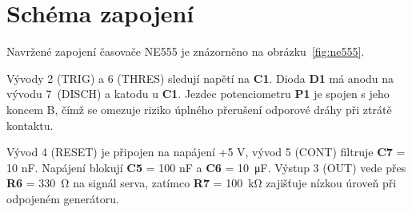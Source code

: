 \section{Schéma zapojení}

Navržené zapojení časovače NE555 je znázorněno na obrázku~\ref{fig:ne555}.

\noindent\begin{minipage}{\textwidth}\centering

\captionsetup{hypcap=false}
\label{fig:ne555}
\end{minipage}\medskip

Vývody 2 (TRIG) a 6 (THRES) sledují napětí na \textbf{C1}. Dioda \textbf{D1} má anodu na vývodu 7~(DISCH) a katodu u \textbf{C1}. Jezdec potenciometru \textbf{P1} je spojen s jeho koncem B, čímž se omezuje riziko úplného přerušení odporové dráhy při ztrátě kontaktu.

Vývod 4 (RESET) je připojen na napájení +5 V, vývod 5 (CONT) filtruje \textbf{C7} = 10 nF. Napájení blokují \textbf{C5} = 100 nF a \textbf{C6} = 10~\si{\micro\farad}. Výstup 3 (OUT) vede přes \textbf{R6} = 330~\si{\ohm} na signál serva, zatímco \textbf{R7} = 100~k\si{\ohm} zajišťuje nízkou úroveň při odpojeném generátoru. ~\cite{ne555}